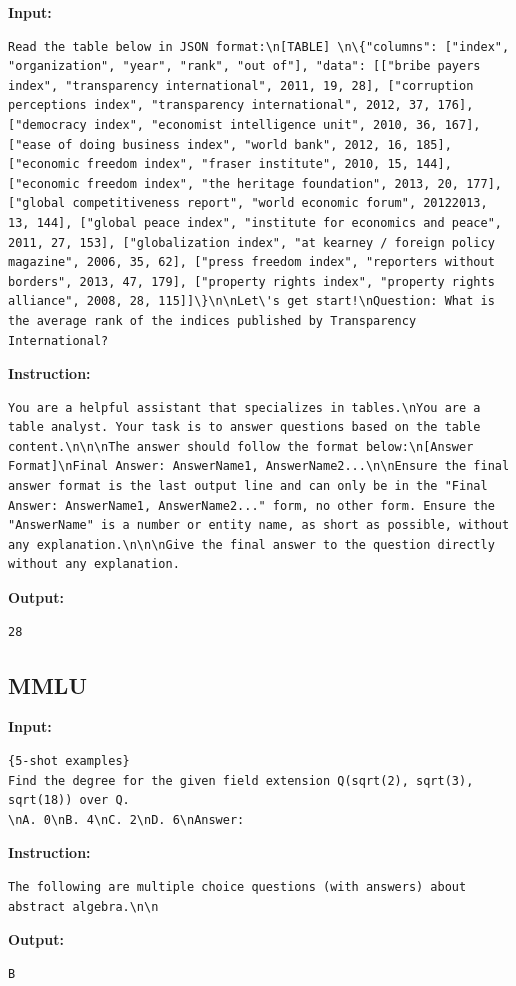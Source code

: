 \documentclass[11pt]{article}
\begin{document}
\textbf{Input:}
\begin{lstlisting}
Read the table below in JSON format:\n[TABLE] \n\{"columns": ["index", "organization", "year", "rank", "out of"], "data": [["bribe payers index", "transparency international", 2011, 19, 28], ["corruption perceptions index", "transparency international", 2012, 37, 176], ["democracy index", "economist intelligence unit", 2010, 36, 167], ["ease of doing business index", "world bank", 2012, 16, 185], ["economic freedom index", "fraser institute", 2010, 15, 144], ["economic freedom index", "the heritage foundation", 2013, 20, 177], ["global competitiveness report", "world economic forum", 20122013, 13, 144], ["global peace index", "institute for economics and peace", 2011, 27, 153], ["globalization index", "at kearney / foreign policy magazine", 2006, 35, 62], ["press freedom index", "reporters without borders", 2013, 47, 179], ["property rights index", "property rights alliance", 2008, 28, 115]]\}\n\nLet\'s get start!\nQuestion: What is the average rank of the indices published by Transparency International?
\end{lstlisting}
\textbf{Instruction:}
\begin{lstlisting}
You are a helpful assistant that specializes in tables.\nYou are a table analyst. Your task is to answer questions based on the table content.\n\n\nThe answer should follow the format below:\n[Answer Format]\nFinal Answer: AnswerName1, AnswerName2...\n\nEnsure the final answer format is the last output line and can only be in the "Final Answer: AnswerName1, AnswerName2..." form, no other form. Ensure the "AnswerName" is a number or entity name, as short as possible, without any explanation.\n\n\nGive the final answer to the question directly without any explanation.
\end{lstlisting}
\textbf{Output:}
\begin{lstlisting}
28
\end{lstlisting}



\subsection{MMLU}
\textbf{Input:}
\begin{lstlisting}
{5-shot examples}
Find the degree for the given field extension Q(sqrt(2), sqrt(3), sqrt(18)) over Q.	
\nA. 0\nB. 4\nC. 2\nD. 6\nAnswer:
\end{lstlisting}
\textbf{Instruction:}
\begin{lstlisting}
The following are multiple choice questions (with answers) about abstract algebra.\n\n
\end{lstlisting}
\textbf{Output:}
\begin{lstlisting}
B
\end{lstlisting}
\end{document}
